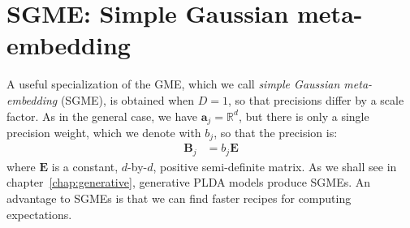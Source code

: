 \documentclass[a4paper,oneside,12pt,english]{report}
\def\R{\mathbb{R}}
\def\Bmat{\mathbf{B}}
\def\Emat{\mathbf{E}}
\def\avec{\mathbf{a}}
\begin{document}
%
%


\section{SGME: Simple Gaussian meta-embedding}
\label{sec:SGME}
A useful specialization of the GME, which we call \emph{simple Gaussian meta-embedding} (SGME), is obtained when $D=1$, so that precisions differ by a scale factor. As in the general case, we have $\avec_j=\R^d$, but there is only a single precision weight, which we denote with $b_j$, so that the precision is: 
\begin{align}
\Bmat_j &= b_j\Emat
\end{align}
where $\Emat$ is a constant, $d$-by-$d$, positive semi-definite matrix. As we shall see in chapter~\ref{chap:generative}, generative PLDA models produce SGMEs. An advantage to SGMEs is that we can find faster recipes for computing expectations. 
\end{document}
